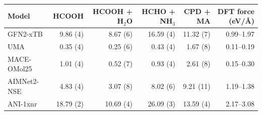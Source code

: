 \begin{tabular}{@{}lrrrrr@{}}
\toprule
Model & HCOOH & HCOOH + H$_2$O & HCHO + NH$_3$ & CPD + MA & DFT force (eV/\AA) \\
\midrule
GFN2-xTB & 9.86 (4) & 8.67 (6) & 16.59 (4) & 11.32 (7) & 0.99--1.97 \\
UMA & 0.35 (4) & 0.25 (6) & 0.43 (4) & 1.67 (8) & 0.11--0.19 \\
MACE-OMol25 & 1.01 (4) & 0.52 (7) & 0.93 (4) & 2.61 (8) & 0.15--0.30 \\
AIMNet2-NSE & 4.83 (4) & 3.07 (8) & 8.02 (6) & 9.21 (11) & 1.19--1.38 \\
ANI-1xnr & 18.79 (2) & 10.69 (4) & 26.09 (3) & 13.59 (4) & 2.17--3.08 \\
\bottomrule
\end{tabular}
